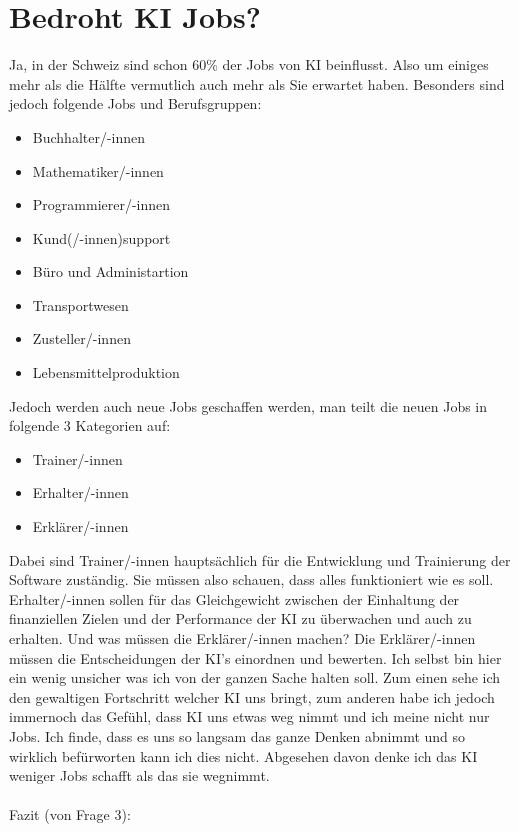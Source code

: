 \section{Bedroht KI Jobs?}
Ja, in der Schweiz sind schon 60\% der Jobs von KI beinflusst. Also um einiges mehr als die Hälfte vermutlich auch mehr als Sie erwartet haben. Besonders sind jedoch folgende Jobs und Berufsgruppen:
\begin{itemize}
    \item Buchhalter/-innen
    \item Mathematiker/-innen
    \item Programmierer/-innen
    \item Kund(/-innen)support
    \item Büro und Administartion
    \item Transportwesen
    \item Zusteller/-innen
    \item Lebensmittelproduktion
\end{itemize}
Jedoch werden auch neue Jobs geschaffen werden, man teilt die neuen Jobs in folgende 3 Kategorien auf:
\begin{itemize}
    \item Trainer/-innen
    \item Erhalter/-innen
    \item Erklärer/-innen
\end{itemize}
Dabei sind Trainer/-innen hauptsächlich für die Entwicklung und Trainierung der Software zuständig. Sie müssen also schauen, dass alles funktioniert wie es soll.
Erhalter/-innen sollen für das Gleichgewicht zwischen der Einhaltung der finanziellen Zielen und der Performance der KI zu überwachen und auch zu erhalten.
Und was müssen die Erklärer/-innen machen? Die Erklärer/-innen müssen die Entscheidungen der KI's einordnen und bewerten.\citep{bedrohte-jobs-kununu}
Ich selbst bin hier ein wenig unsicher was ich von der ganzen Sache halten soll. Zum einen sehe ich den  gewaltigen Fortschritt welcher KI uns bringt, zum anderen habe ich jedoch immernoch das Gefühl,
dass KI uns etwas weg nimmt und ich meine nicht nur Jobs. Ich finde, dass es uns so langsam das ganze Denken abnimmt und so wirklich befürworten kann ich dies nicht. Abgesehen davon denke ich das KI weniger Jobs schafft als das sie wegnimmt.
\\
\\{\large Fazit (von Frage 3):}
\\

